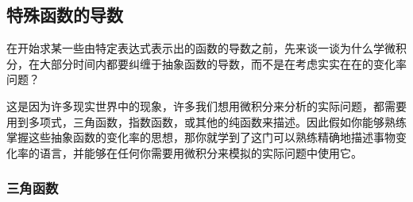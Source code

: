 \documentclass{ctexart}
\numberwithin{equation}{section}
\numberwithin{figure}{section}
\begin{document}
\subsection{特殊函数的导数}

在开始求某一些由特定表达式表示出的函数的导数之前，先来谈一谈为什么学微积分，在大部分时间内都要纠缠于抽象函数的导数，而不是在考虑实实在在的变化率问题\cite{3Blue1Brown03YongJiHeLaiQiuDao2018}？

这是因为许多现实世界中的现象，许多我们想用微积分来分析的实际问题，都需要用到多项式，三角函数，指数函数，或其他的纯函数来描述。因此假如你能够熟练掌握这些抽象函数的变化率的思想，那你就学到了这门可以熟练精确地描述事物变化率的语言，并能够在任何你需要用微积分来模拟的实际问题中使用它。

\subsubsection{三角函数}\label{sec:trigfunc}
\end{document}
